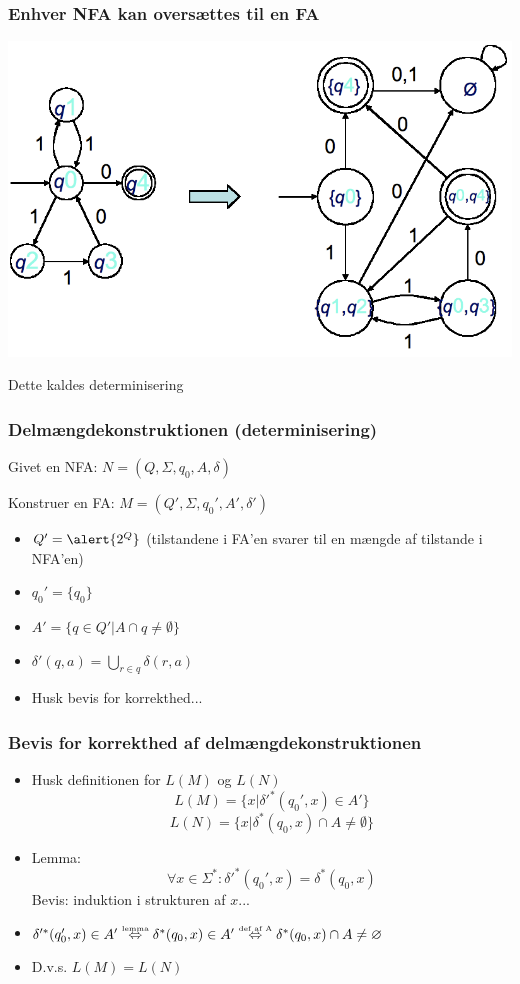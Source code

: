 \begin{frame}
\frametitle{Enhver NFA kan oversættes til en FA}
\begin{center}
  \includegraphics[scale=0.3]{images/2_seminar_convert}
\end{center}
\pause

Dette kaldes determinisering
\end{frame}

\begin{frame}
\frametitle{Delmængdekonstruktionen (determinisering)}
Givet en NFA: $N=(Q, \Sigma, q_0, A, \delta)$

Konstruer en FA: $M=(Q', \Sigma, q_0', A', \delta')$
\pause
\begin{itemize}[<+->]
\item $Q'=\alert{2^{Q}}$ (tilstandene i FA'en svarer til en mængde af tilstande i NFA'en)
\item $q_0' = \{q_0\}$
\item $A' = \{q \in Q' | A \cap q \neq \emptyset \}$
\item $\delta'(q, a) = \bigcup_{r\in q}\delta(r,a)$
\item Husk bevis for korrekthed...
\end{itemize}
\end{frame}
\begin{frame}
  \frametitle{Bevis for korrekthed af delmængdekonstruktionen}
\begin{itemize}[<+->]
\item Husk definitionen for $L(M)$ og $L(N)$
\[L(M) = \{x | \delta'^*(q_0', x) \in A'\}\]
\[L(N) = \{x | \delta^*(q_0, x) \cap A \neq \emptyset\}\]
\item Lemma:
\[\forall x\in \Sigma^*: \delta'^*(q_0', x) = \delta^*(q_0, x)\]
Bevis: induktion i strukturen af $x$...
\item $ \delta'^*(q_0', x) \in A' \overset{\text{\tiny{lemma}}}{\Leftrightarrow} 
 \delta^*(q_0, x) \in A' \overset{\text{\tiny{def af A}}}{\Leftrightarrow} \delta^*(q_0, x) \cap A \neq \emptyset$
\item D.v.s. $L(M)=L(N)$
\end{itemize}
\end{frame}

